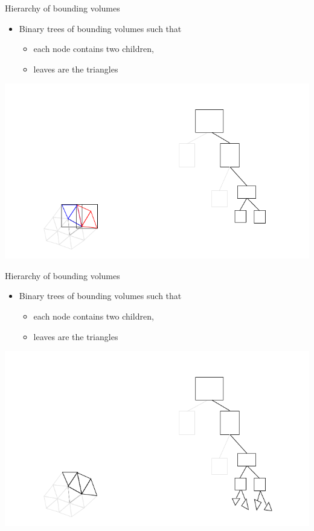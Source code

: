 \begin{frame} {Hierarchy of bounding volumes}
  \begin{itemize}
  \item Binary trees of bounding volumes such that
    \begin{itemize}
    \item each node contains two children,
    \item leaves are the triangles
    \end{itemize}
  \end{itemize}
  \centerline {
    \includegraphics[width=.8\linewidth]{figures/bvh8.pdf}
  }
\end{frame}

\begin{frame} {Hierarchy of bounding volumes}
  \begin{itemize}
  \item Binary trees of bounding volumes such that
    \begin{itemize}
    \item each node contains two children,
    \item leaves are the triangles
    \end{itemize}
  \end{itemize}
  \centerline {
    \includegraphics[width=.8\linewidth]{figures/bvh9.pdf}
  }
\end{frame}

